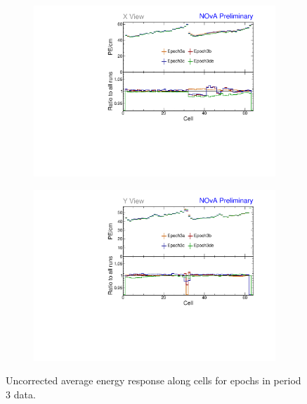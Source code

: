 \begin{figure}[hbtp]
\centering
\begin{subfigure}[b]{0.495\textwidth}
\centering
\includegraphics[width=\textwidth]{Plots/TBCalibration/Attenprofs_P3Data_CellPE_X_Combined.pdf}
\end{subfigure}
\begin{subfigure}[b]{0.495\textwidth}
\centering
\includegraphics[width=\textwidth]{Plots/TBCalibration/Attenprofs_P3Data_CellPE_Y_Combined.pdf}
\end{subfigure}
\caption{Uncorrected average energy response along cells for epochs in period 3 data.}
\label{fig:CalibhistCellPE_period3}
\end{figure}

